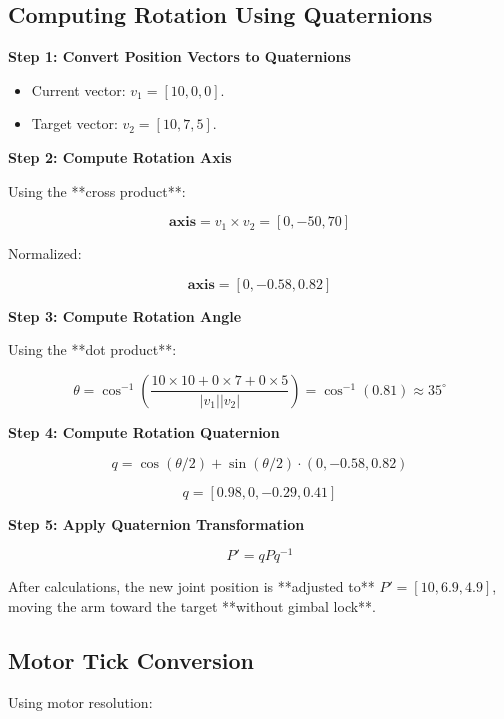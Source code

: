 \documentclass{article}
\begin{document}
\subsection{Computing Rotation Using Quaternions}
\textbf{Step 1: Convert Position Vectors to Quaternions}

\begin{itemize}
    \item Current vector: \( v_1 = [10, 0, 0] \).
    \item Target vector: \( v_2 = [10, 7, 5] \).
\end{itemize}

\textbf{Step 2: Compute Rotation Axis}

Using the **cross product**:



\[
\mathbf{axis} = v_1 \times v_2 = [0, -50, 70]
\]



Normalized:



\[
\mathbf{axis} = [0, -0.58, 0.82]
\]



\textbf{Step 3: Compute Rotation Angle}

Using the **dot product**:



\[
\theta = \cos^{-1} \left( \frac{10 \times 10 + 0 \times 7 + 0 \times 5}{|v_1| |v_2|} \right) = \cos^{-1} (0.81) \approx 35^\circ
\]



\textbf{Step 4: Compute Rotation Quaternion}



\[
q = \cos(\theta/2) + \sin(\theta/2) \cdot (0, -0.58, 0.82)
\]





\[
q = [0.98, 0, -0.29, 0.41]
\]



\textbf{Step 5: Apply Quaternion Transformation}



\[
P' = q P q^{-1}
\]



After calculations, the new joint position is **adjusted to** \( P' = [10, 6.9, 4.9] \), moving the arm toward the target **without gimbal lock**.

\subsection{Motor Tick Conversion}
Using motor resolution:
\end{document}
